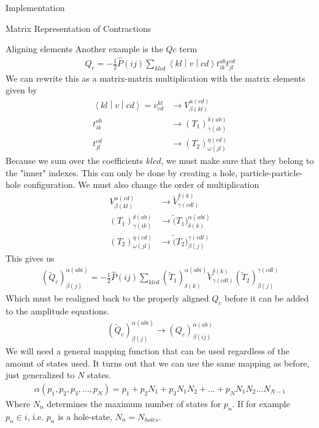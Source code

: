 \documentclass[twoside,english]{uiofysmaster}
\begin{document}
\begin{chapter}{Implementation}
\begin{section}{Matrix Representation of Contractions}
\begin{subsection}{Aligning elements}
			Another example is the $Qc$ term
			\begin{align}
				Q_c = -\frac{1}{2} \hat P(ij) \sum_{klcd} \left< kl \middle| v \middle| cd \right> t_{ik}^{ab} t_{jl}^{cd} 
			\end{align}
			We can rewrite this as a matrix-matrix multiplication with the matrix elements given by
			\begin{align}
				\left< kl \middle| v \middle| cd \right> = v_{cd}^{kl} & \rightarrow V^{\alpha(cd)}_{\beta(kl)} \\
				t_{ik}^{ab} & \rightarrow (T_1)_{\gamma(ik)}^{\delta(ab)} \\
				t_{jl}^{cd} & \rightarrow (T_2)_{\omega(jl)}^{\eta(cd)}
			\end{align}
			Because we sum over the coefficients $klcd$, we must make sure that they belong to the "inner" indexes. This can only be done by creating a hole, particle-particle-hole configuration. We must also change the order of multiplication
			\begin{align}
				V^{\alpha(cd)}_{\beta(kl)} &  \rightarrow \tilde V^{\delta(k)}_{\gamma(cdl)} \\
				(T_1)_{\gamma(ik)}^{\delta(ab)} & \rightarrow \tilde (T_1)^{\alpha(abi)}_{\delta(k)} \\
				(T_2)_{\omega(jl)}^{\eta(cd)} & \rightarrow \tilde (T_2)^{\gamma(cdl)}_{\beta(j)}
			\end{align}
			This gives us
			\begin{align}
				( \tilde Q_c )_{\beta(j)}^{\alpha(abi)} = -\frac{1}{2} \hat P(ij) \sum_{klcd} (\tilde T_1)^{\alpha(abi)}_{\delta(k)} \tilde V^{\delta(k)}_{\gamma(cdl)} (\tilde T_2)^{\gamma(cdl)}_{\beta(j)}
			\end{align}
			Which must be realigned back to the properly aligned $Q_c$ before it can be added to the amplitude equations.
			\begin{align}
				( \tilde Q_c )_{\beta(j)}^{\alpha(abi)} \rightarrow (Q_c)_{\beta(ij)}^{\alpha(ab)}
			\end{align}
			We will need a general mapping function that can be used regardless of the amount of states used. It turns out that we can use the same mapping as before, just generalized to $N$ states.
			\begin{align}
				\alpha(p_1,p_2,p_3,...,p_N) = p_1 + p_2N_1 + p_3N_1N_2 + ... + p_N N_1 N_2 ... N_{N-1} 
			\end{align}
			Where $N_n$ determines the maximum number of states for $p_n$. If for example $p_n \in i$, i.e. $p_n$ is a hole-state, $N_n = N_{holes}$.


\end{subsection}
\end{section}
\end{chapter}
\end{document}

